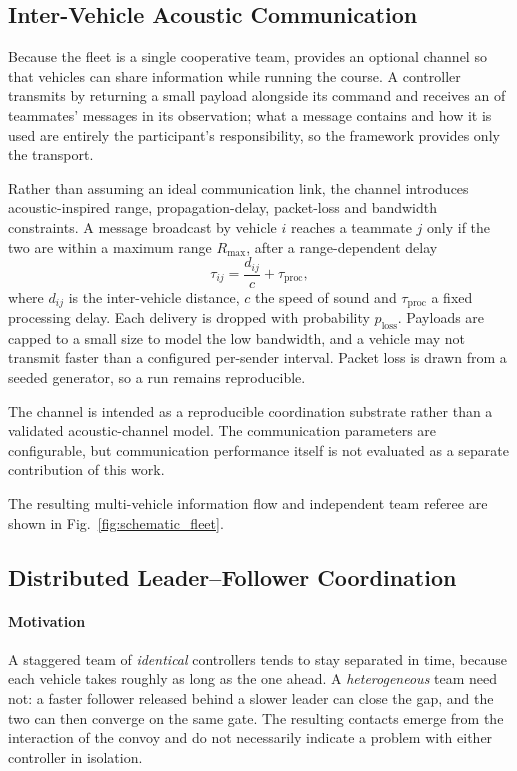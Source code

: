 \subsection{Inter-Vehicle Acoustic Communication}

Because the fleet is a single cooperative team, \mra{} provides an optional
channel so that vehicles can share information while running the course. A
controller transmits by returning a small  payload alongside its
command and
receives an  of teammates' messages in its observation; what a message
contains and how it is used are entirely the participant's responsibility, so the
framework provides only the transport.

Rather than assuming an ideal communication link, the channel introduces
acoustic-inspired range, propagation-delay, packet-loss and bandwidth
constraints. A message broadcast by vehicle $i$ reaches a
teammate $j$ only if the two are within a maximum range $R_{\max}$, after a
range-dependent delay
\begin{equation}
\label{eq:comms_latency}
\tau_{ij}=\frac{d_{ij}}{c}+\tau_{\mathrm{proc}},
\end{equation}
where $d_{ij}$ is the inter-vehicle distance, $c$ the speed of sound and
$\tau_{\mathrm{proc}}$ a fixed processing delay. Each delivery is dropped with
probability $p_{\mathrm{loss}}$. Payloads are capped to a small size to model the
low bandwidth, and a vehicle may not transmit faster than a configured per-sender
interval. Packet loss is drawn from a seeded generator, so a run remains
reproducible.

The channel is intended as a reproducible coordination substrate rather than a
validated acoustic-channel model. The communication parameters are configurable,
but communication performance itself is not evaluated as a separate contribution
of this work.

The resulting multi-vehicle information flow and independent team referee are
shown in Fig.~\ref{fig:schematic_fleet}.


\subsection{Distributed Leader--Follower Coordination}
\label{sec:coordination}

\paragraph{Motivation} A staggered team of \emph{identical} controllers tends to
stay separated in time, because each vehicle takes roughly as long as the one
ahead. A \emph{heterogeneous} team need not: a faster follower released behind a
slower leader can close the gap, and the two can then converge on the same gate.
The resulting contacts emerge from the interaction of the convoy and do not
necessarily indicate a problem with either controller in isolation.

